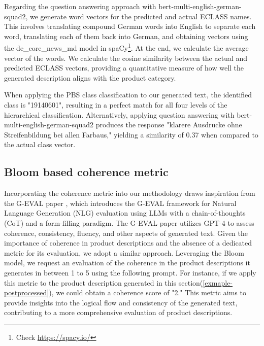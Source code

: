 Regarding the question answering approach with bert-multi-english-german-squad2, we generate word vectors for the predicted and actual ECLASS names. This involves translating compound German words into English to separate each word, translating each of them back into German, and obtaining vectors using the de\_core\_news\_md model in spaCy\footnote{Check \url{https://spacy.io/}}. At the end, we calculate the average vector of the words. We calculate the cosine similarity between the actual and predicted ECLASS vectors, providing a quantitative measure of how well the generated description aligns with the product category.

When applying the PBS class classification to our generated text, the identified class is "19140601", resulting in a perfect match for all four levels of the hierarchical classification. Alternatively, applying question answering with bert-multi-english-german-squad2 produces the response "klarere Ausdrucke ohne Streifenbildung bei allen Farbaus," yielding a similarity of 0.37 when compared to the actual class vector. 
\subsection{Bloom based coherence metric}\label{coherence_metric_methods}

Incorporating the coherence metric into our methodology draws inspiration from the G-EVAL paper \cite{liu2023geval}, which introduces the G-EVAL framework for Natural Language Generation (NLG) evaluation using LLMs with a chain-of-thoughts (CoT) and a form-filling paradigm. The G-EVAL paper utilizes GPT-4 to assess coherence, consistency, fluency, and other aspects of generated text. Given the importance of coherence in product descriptions and the absence of a dedicated metric for its evaluation, we adopt a similar approach. Leveraging the Bloom model, we request an evaluation of the coherence in the product descriptions it generates in between 1 to 5 using the following prompt. For instance, if we apply this metric to the product description generated in this section(\autoref{exmaple-postprocessed}), we could obtain a coherence score of "2." This metric aims to provide insights into the logical flow and consistency of the generated text, contributing to a more comprehensive evaluation of product descriptions.

